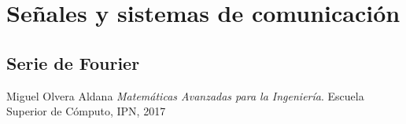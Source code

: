 \documentclass[12pt, fleqn]{report}                             %
\theoremstyle{break}                                            %
\begin{document}
\part{Señales y sistemas de comunicación}
\clearpage

    \chapter{Serie de Fourier}
        \clearpage



\begin{thebibliography}{10}

        Miguel Olvera Aldana
        \textit{Matemáticas Avanzadas para la Ingeniería}. 
        Escuela Superior de Cómputo, IPN, 2017

\end{thebibliography}
\end{document}
